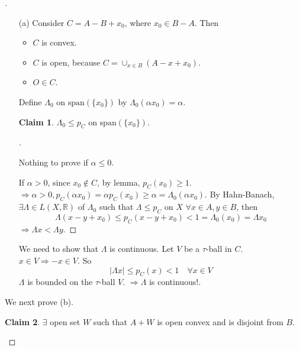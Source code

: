 \documentclass{article}
\theoremstyle{definition}
\newtheorem*{clm}{Claim}
\newenvironment{proofs}[1][\proofname]{%
  \begin{proof}[#1]$ $\par\nobreak\ignorespaces
}{%
  \end{proof}
}
\newcommand{\RR}{\mathbb R}
\newcommand{\Ra}{\Rightarrow}
\begin{document}
\begin{proofs}
	\begin{enumerate}
		\item[(a)] Consider $C = A - B + x_0$, where $x_0 \in B - A$.
			Then 
			\begin{itemize}
				\item $C$ is convex.

				\item $C$ is open, because $C = \cup_{x \in B} (A - x + x_0)$.

				\item $O \in C$.
			\end{itemize}
			Define $\Lambda_0$ on $\text{span}(\{x_0\})$ by $\Lambda_0 (\alpha x_0) = \alpha$.
			\begin{clm}
				$\Lambda_0 \leq p_C$ on $\text{span}(\{x_0\})$.
			\end{clm}
			
			\begin{proofs}
				Nothing to prove if $\alpha \leq 0$.
				\par If $\alpha > 0$, since $x_0 \notin C$, by lemma, $p_C(x_0) \geq 1$.
				$\Ra \alpha > 0, p_C(\alpha x_0) = \alpha p_C(x_0) \geq \alpha = \Lambda_0(\alpha x_0)$.
				By Hahn-Banach, $\exists \Lambda \in L(X, \RR)$ of $\Lambda_0$ such that $\Lambda \leq p_C$ on $X$ $\forall x \in A, y \in B$, then
				\[
					\Lambda(x - y + x_0) \leq p_C(x - y + x_0) < 1 = \Lambda_0 (x_0) = \Lambda x_0
				\]
				$\Ra \Lambda x < \Lambda y$.
			\end{proofs}
			We need to show that $\Lambda$ is continuous.
			Let $V$ be a $\tau$-ball in $C$.
			$x \in V \Ra -x \in V$.
			So 
			\[
				|\Lambda x| \leq p_C(x) < 1 \quad \forall x \in V
			\]
			$\Lambda$ is bounded on the $\tau$-ball $V$.
			$\Ra \Lambda$ is continuous!.

	\end{enumerate}

	We next prove (b).
	\begin{clm}
		$\exists$ open set $W$ such that $A + W$ is open convex and is disjoint from $B$.
	\end{clm}


\end{proofs}
\end{document}
